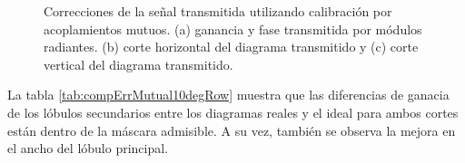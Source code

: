 \begin{figure}[H]
	\centering

	\caption{Correcciones de la señal transmitida utilizando calibración por acoplamientos mutuos. (a) ganancia y fase 
		transmitida por módulos radiantes. (b) corte horizontal del diagrama transmitido y (c) corte vertical del diagrama transmitido.}
	\label{fig:compErrMutual10degRow}
\end{figure}

La tabla \ref{tab:compErrMutual10degRow} muestra que las diferencias de ganacia de los lóbulos secundarios entre los diagramas 
reales y el ideal para ambos cortes están dentro de la máscara admisible. A su vez, también se observa la mejora en el ancho 
del lóbulo principal. 

